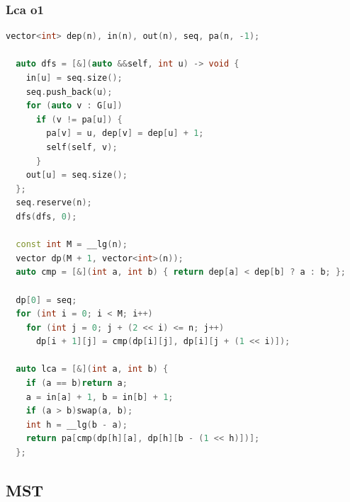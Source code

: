 \documentclass[10pt,landscape,a4paper,twocolumn]{article}
\begin{document}
\subsubsection{Lca o1}
\begin{lstlisting}[language=C++]
  vector<int> dep(n), in(n), out(n), seq, pa(n, -1);

  auto dfs = [&](auto &&self, int u) -> void {
	in[u] = seq.size();
	seq.push_back(u);
	for (auto v : G[u])
	  if (v != pa[u]) {
		pa[v] = u, dep[v] = dep[u] + 1;
		self(self, v);
	  }
	out[u] = seq.size();
  };
  seq.reserve(n);
  dfs(dfs, 0);

  const int M = __lg(n);
  vector dp(M + 1, vector<int>(n));
  auto cmp = [&](int a, int b) { return dep[a] < dep[b] ? a : b; };

  dp[0] = seq;
  for (int i = 0; i < M; i++)
	for (int j = 0; j + (2 << i) <= n; j++)
	  dp[i + 1][j] = cmp(dp[i][j], dp[i][j + (1 << i)]);

  auto lca = [&](int a, int b) {
	if (a == b)return a;
	a = in[a] + 1, b = in[b] + 1;
	if (a > b)swap(a, b);
	int h = __lg(b - a);
	return pa[cmp(dp[h][a], dp[h][b - (1 << h)])];
  };

\end{lstlisting}
\subsection{MST}
\end{document}

